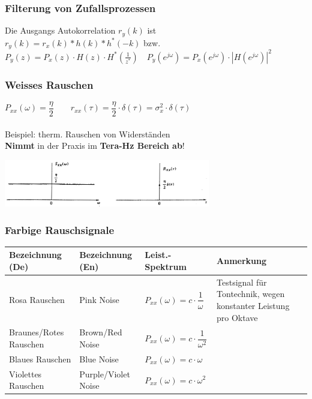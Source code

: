 \subsubsection{Filterung von Zufallsprozessen}
Die Ausgangs Autokorrelation $r_y(k)$ ist\\
 $r_y(k) = r_x(k)\ast h(k) \ast h^*(-k)$ bzw. $\boxed{P_{y}(z) = P_{x}(z)\cdot H(z) \cdot H^*(\frac{1}{z^*}) \quad
  P_{y}(e^{j\omega})=P_x(e^{j\omega})\cdot|H(e^{j\omega})|^2}$

\subsubsection{Weisses Rauschen}
\begin{center}
	\begin{minipage}{8cm}
		$P_{xx}(\omega) = \dfrac{\eta}{2} \qquad r_{xx}(\tau) = \dfrac{\eta}{2} \cdot \delta(\tau)= \sigma_x^2 \cdot \delta(\tau)$ \\ \\
		Beispiel: therm. Rauschen von Widerständen \\
		\textbf{Nimmt} in der Praxis im \textbf{Tera-Hz Bereich ab}!
  	\end{minipage}
	\begin{minipage}{10cm}
		\includegraphics[width=9cm]{bilder/weisses_rauschen.png}
  	\end{minipage}
\end{center}

\subsubsection{Farbige Rauschsignale}
\renewcommand{\arraystretch}{2}
\begin{tabular}[c]{ | p{4cm} | p{3.5cm} | p{3cm} | p{6cm} | }
	\hline
		\textbf{Bezeichnung (De)}
		& \textbf{Bezeichnung (En)}
		& \textbf{Leist.-Spektrum}
		& \textbf{Anmerkung} \\
	\hline
		Rosa Rauschen
		& Pink Noise
		& $P_{xx}(\omega) = c \cdot \dfrac{1}{\omega}$
		& Testsignal für Tontechnik, wegen konstanter Leistung pro Oktave \\
	\hline
		Braunes/Rotes Rauschen
		& Brown/Red Noise
		&	$P_{xx}(\omega) = c \cdot \dfrac{1}{\omega^2}$
		& \\
	\hline
		Blaues Rauschen
		& Blue Noise
		&	$P_{xx}(\omega) = c \cdot \omega$
		& \\
	\hline
		Violettes Rauschen
		& Purple/Violet Noise
		&	$P_{xx}(\omega) = c \cdot \omega^2$
		& \\
    \hline
\end{tabular}
\renewcommand{\arraystretch}{1}

